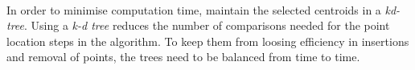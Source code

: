\paragraph{}
In order to minimise computation time, \citet{incrementalcov} maintain the selected centroids in a \emph{kd-tree}. Using a \emph{k-d tree} reduces the number of comparisons needed for the point location steps in the algorithm. To keep them from loosing efficiency in insertions and removal of points, the trees need to be balanced from time to time. 
